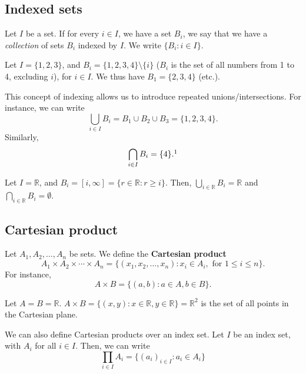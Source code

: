 \documentclass[12pt,oneside]{article}
\begin{document}
\subsection{Indexed sets}

Let $I$ be a set. If for every $i \in I$, we have a set $B_i$, we say that we have a \textit{collection} of sets $B_i$ indexed by $I$. We write $\{B_i : i \in I\}$.

\begin{example}
  Let $I = \{1, 2, 3\}$, and $B_i = \{1,2,3,4\}\setminus \{i\}$ ($B_i$ is the set of all numbers from 1 to 4, excluding $i$), for $i \in I$. We thus have $B_1 = \{2, 3, 4\}$ (etc.).

  This concept of indexing allows us to introduce repeated unions/intersections. For instance, we can write \[\bigcup_{i \in I} B_i = B_1 \cup B_2 \cup B_3 = \{1,2,3,4\}.\]
  Similarly, \[\bigcap_{i \in I} B_i = \{4\}.\footnotemark\]
\end{example}

\begin{example}
  Let $I = \mathbb{R}$, and $B_i = [i, \infty] = \{r \in \mathbb{R} : r \geq i\}$. Then, $\bigcup_{i \in \mathbb{R}} B_i = \mathbb{R}$ and $\bigcap_{i \in \mathbb{R}} B_i = \emptyset$.
\end{example}

\subsection{Cartesian product}

Let $A_1, A_2, \dots, A_n$ be sets. We define the \textbf{Cartesian product} \[A_1 \times A_2 \times \cdots \times A_n = \{(x_1, x_2, \dots, x_n) : x_i \in A_i, \text{ for } 1 \leq i \leq n\}.\] For instance, \[A \times B = \{(a, b) : a \in A, b \in B\}.\]

\begin{example}
  Let $A = B = \mathbb{R}$. $A \times B = \{(x,y) : x \in \mathbb{R}, y \in \mathbb{R} \} = \mathbb{R}^2$ is the set of all points in the Cartesian plane.
\end{example}

We can also define Cartesian products over an index set. Let $I$ be an index set, with $A_i$ for all $i \in I$. Then, we can write \[\prod_{i \in I}A_i = \{(a_i)_{i \in I} : a_i \in A_i\}\]
\end{document}
